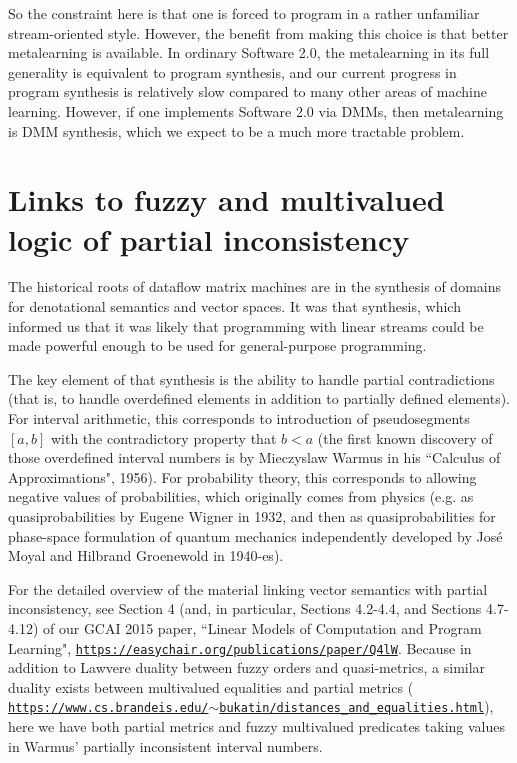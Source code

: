 \documentclass{article}
\begin{document}
So the constraint here is that one is forced to program in a rather unfamiliar stream-oriented style.
However, the benefit from making this choice is that better metalearning is available. In ordinary Software 2.0,
the metalearning in its full generality is equivalent to program synthesis, and our current progress in
program synthesis is relatively slow compared to many other areas of machine learning.
However, if one implements Software 2.0 via DMMs, then metalearning is DMM synthesis,
which we expect to be a much more tractable problem.

\section{Links to fuzzy and multivalued logic of
partial inconsistency}

The historical roots of dataflow matrix machines are in the synthesis of domains
for denotational semantics and vector spaces. It was that synthesis, which informed us that it was likely
that programming with linear streams could be made powerful enough to be used for general-purpose programming.

The key element of that synthesis is the ability to handle partial contradictions (that is, to handle
overdefined elements in addition to partially defined elements). For interval arithmetic,  
this corresponds to introduction of pseudosegments $[a, b]$ with the contradictory property that
$b < a$ (the first known discovery of those overdefined interval numbers is by Mieczyslaw Warmus in his ``Calculus of Approximations", 1956). For probability theory, this corresponds to allowing negative values of probabilities,
which originally comes from physics (e.g. as quasiprobabilities by Eugene Wigner in 1932, and then as quasiprobabilities for phase-space formulation
of quantum mechanics independently developed by Jos\'e Moyal and Hilbrand Groenewold in 1940-es).

For the detailed overview of the material linking vector semantics with partial inconsistency, see Section 4 (and, in particular, Sections 4.2-4.4, and Sections 4.7-4.12) of our GCAI 2015 paper, ``Linear Models of Computation and Program Learning", \href{https://easychair.org/publications/paper/Q4lW}{\tt https://easychair.org/publications/paper/Q4lW}. Because in addition to Lawvere duality between fuzzy orders and quasi-metrics, a similar duality exists between multivalued equalities and partial metrics ( \href{https://www.cs.brandeis.edu/~bukatin/distances_and_equalities.html}{\tt https://www.cs.brandeis.edu/$\sim$bukatin/distances\_and\_equalities.html}), here we have both partial metrics and fuzzy multivalued predicates taking values in Warmus' partially inconsistent interval numbers.
\end{document}
